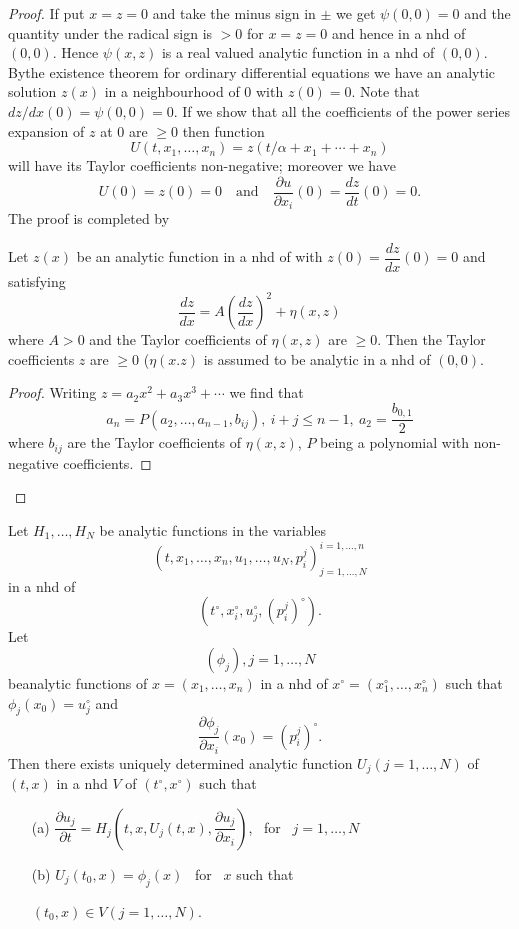 \begin{proof}
If put $x=z=0$ and take the minus sign in $\pm$ we get $\psi (0,0)=0$ and the quantity under the radical sign is $>0$ for $x=z=0$ and hence in a nhd of $(0,0)$. Hence $\psi(x,z)$ is a real valued analytic function in a nhd of $(0,0)$. By\pageoriginale the existence theorem for ordinary differential equations we have an analytic solution $z(x)$ in a neighbourhood of $0$ with $z(0)=0$. Note that $dz/dx(0)=\psi (0,0)=0$. If we show that all the coefficients of the power series expansion of $z$ at $0$ are $\geq 0$ then function
$$
U(t,x_{1},\ldots,x_{n})=z(t/\alpha +x_{1}+\cdots+x_{n})
$$
will have its Taylor coefficients non-negative; moreover we have
$$
U(0)=z(0)=0\quad\text{and}\quad \frac{\partial u}{\partial x_{i}}(0)=\dfrac{dz}{dt}(0)=0.
$$
The proof is completed by

\begin{lemma*}
Let $z(x)$ be an analytic function in a nhd of with $z(0)=\dfrac{dz}{dx}(0)=0$ and satisfying
$$
\frac{dz}{dx}=A\left(\frac{dz}{dx}\right)^{2}+\eta (x,z)
$$
where $A>0$ and the Taylor coefficients of $\eta (x,z)$ are $\geq 0$. Then the Taylor coefficients $z$ are $\geq 0$ ($\eta(x.z)$ is assumed to be analytic in a nhd of $(0,0)$.
\end{lemma*}

\begin{proof}
Writing $z=a_{2}x^{2}+a_{3}x^{3}+\cdots$ we find that
$$
a_{n}=P(a_{2},\ldots,a_{n-1},b_{ij}), \ i+j\leq n - 1, \ a_{2}=\dfrac{b_{0,1}}{2}
$$
where $b_{ij}$ are the Taylor coefficients of $\eta(x,z)$, $P$ being a polynomial with non-negative coefficients. 
\end{proof}
\end{proof}

\begin{theorem*}
Let $H_{1},\ldots,H_{N}$ be analytic functions in the variables
$$
\left(t,x_{1},\ldots,x_{n},u_{1},\ldots,u_{N},p^{j}_{i}\right)^{i=1,\ldots,n}_{j=1,\ldots,N}
$$
in a nhd of
$$
(t^{\circ},x^{\circ}_{i},u^{\circ}_{j},(p^{j}_{i})^{\circ}).
$$
Let
$$
(\phi_{j}),j=1,\ldots,N
$$
be\pageoriginale analytic functions of $x=(x_{1},\ldots,x_{n})$ in a nhd of $x^{\circ}=(x^{\circ}_{1},\ldots,x^{\circ}_{n})$ such that $\phi_{j}(x_{0})=u^{\circ}_{j}$ and
$$
\frac{\partial \phi_{j}}{\partial x_{i}}(x_{0})=(p^{j}_{i})^{\circ}.
$$
Then there exists uniquely determined analytic function $U_{j}(j=1,\ldots,N)$ of $(t,x)$ in a nhd $V$ of $(t^{\circ},x^{\circ})$ such that
\begin{itemize}
\item[\rm(a)] $\dfrac{\partial u_{j}}{\partial t}=H_{j}\left(t,x,U_{j}(t,x),\dfrac{\partial u_{j}}{\partial x_{i}}\right)$, \ for \ $j=1,\ldots,N$

\item[\rm(b)] $U_{j}(t_{0},x)=\phi_{j}(x)$ \ for \ $x$ such that

$(t_{0},x)\in V(j=1,\ldots,N)$.
\end{itemize}
\end{theorem*}

